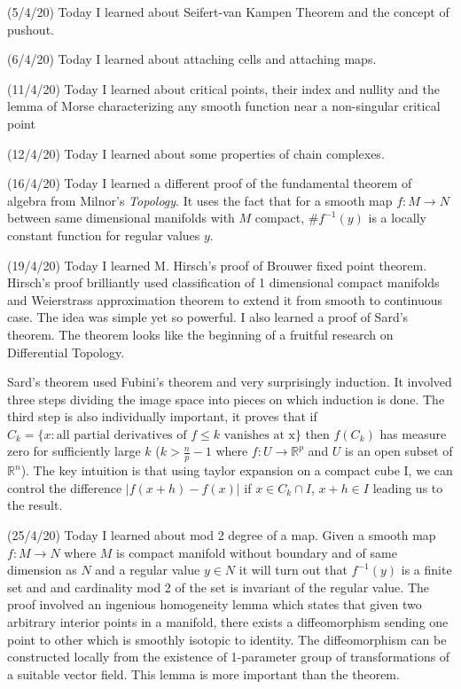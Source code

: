 \documentclass[12pt,a4paper]{article}
\begin{document}
(5/4/20) Today I learned about Seifert-van Kampen Theorem and the concept of pushout.

(6/4/20) Today I learned about attaching cells and attaching maps.

(11/4/20) Today I learned about critical points, their index and nullity and the lemma of Morse characterizing any smooth function near a non-singular critical point

(12/4/20) Today I learned about some properties of chain complexes.

(16/4/20) Today I learned a different proof of the fundamental theorem of algebra from Milnor's \textit{Topology}. It uses the fact that for a smooth map $f: M \to N$ between same dimensional manifolds with $M$ compact, \#$f^{-1}(y)$ is a locally constant function for regular values $y$.

(19/4/20) Today I learned M. Hirsch's proof of Brouwer fixed point theorem. Hirsch's proof brilliantly used classification of 1 dimensional compact manifolds and Weierstrass approximation theorem to extend it from smooth to continuous case. The idea was simple yet so powerful. I also learned a proof of Sard's theorem. The theorem looks like the beginning of a fruitful research on Differential Topology.

Sard's theorem used Fubini's theorem and very surprisingly induction.  It involved three steps dividing the image space into pieces on which induction is done. The third step is also individually important, it proves that if $C_k = \{x : \text{all partial derivatives of } f \le k \text{ vanishes at x}\}$ then $f(C_k)$ has measure zero for sufficiently large $k$ ($k> \frac{n}{p}-1$ where $f : U \to \mathbb{R}^p$ and $U$ is an open subset of $\mathbb{R}^n$). The key intuition is that using taylor expansion on a compact cube I, we can control the difference $|f(x+h)-f(x)|$ if $x \in C_k \cap I$, $x+h \in I$ leading us to the result.

(25/4/20) Today I learned about mod 2 degree of a map. Given a smooth map $f:M \to N$ where $M$ is compact manifold without boundary and of same dimension as $N$ and a regular value $y\in N$ it will turn out that $f^{-1}(y)$ is a finite set and and cardinality mod 2 of the set is invariant of the regular value. The proof involved an ingenious homogeneity lemma which states that given two arbitrary interior points in a manifold, there exists a diffeomorphism sending one point to other which is smoothly isotopic to identity. The diffeomorphism can be constructed locally from the existence of 1-parameter group of transformations of a suitable vector field. This lemma is more important than the theorem. 
\end{document}
